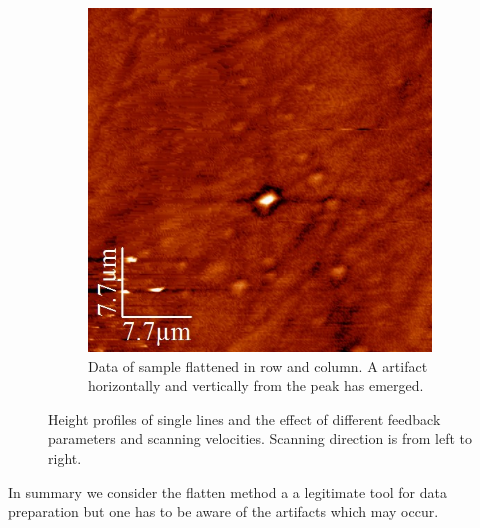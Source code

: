 \documentclass[paper=a4,fontsize=10pt,DIV=18,twocolumn,parskip=half]{scrartcl}
\numberwithin{equation}{section}    %
\begin{document}
\begin{figure}
\begin{subfigure}[t]{0.45\columnwidth}
        \includegraphics[width=\columnwidth]{Bilder/1f}
        \caption{Data of sample  flattened in row and column. A 
        artifact horizontally and vertically from the peak has emerged.}
        \label{7f}
    \end{subfigure}

    \caption{Height profiles of single lines and the effect of different 
    feedback parameters and scanning velocities. Scanning direction is from left 
    to right.}
\end{figure}

In summary we consider the flatten method a a legitimate tool for data 
preparation but one has to be aware of the artifacts which may occur.


\end{document}
